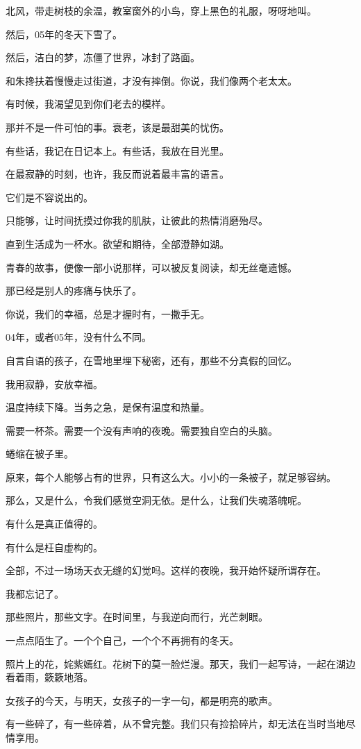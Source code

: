 		北风，带走树枝的余温，教室窗外的小鸟，穿上黑色的礼服，呀呀地叫。

		然后，05年的冬天下雪了。\par
		然后，洁白的梦，冻僵了世界，冰封了路面。

		和朱搀扶着慢慢走过街道，才没有摔倒。你说，我们像两个老太太。\par
		有时候，我渴望见到你们老去的模样。\par
		那并不是一件可怕的事。衰老，该是最甜美的忧伤。

		有些话，我记在日记本上。有些话，我放在目光里。\par
		在最寂静的时刻，也许，我反而说着最丰富的语言。

		它们是不容说出的。

		只能够，让时间抚摸过你我的肌肤，让彼此的热情消磨殆尽。\par
		直到生活成为一杯水。欲望和期待，全部澄静如湖。\par
		青春的故事，便像一部小说那样，可以被反复阅读，却无丝毫遗憾。\par
		那已经是别人的疼痛与快乐了。

		你说，我们的幸福，总是才握时有，一撒手无。\par
		04年，或者05年，没有什么不同。\par
		自言自语的孩子，在雪地里埋下秘密，还有，那些不分真假的回忆。

		我用寂静，安放幸福。

		温度持续下降。当务之急，是保有温度和热量。\par
		需要一杯茶。需要一个没有声响的夜晚。需要独自空白的头脑。

		蜷缩在被子里。

		原来，每个人能够占有的世界，只有这么大。小小的一条被子，就足够容纳。\par
		那么，又是什么，令我们感觉空洞无依。是什么，让我们失魂落魄呢。

		有什么是真正值得的。\par
		有什么是枉自虚构的。

		全部，不过一场场天衣无缝的幻觉吗。这样的夜晚，我开始怀疑所谓存在。

		我都忘记了。

		那些照片，那些文字。在时间里，与我逆向而行，光芒刺眼。\par
		一点点陌生了。一个个自己，一个个不再拥有的冬天。

		照片上的花，姹紫嫣红。花树下的莫一脸烂漫。那天，我们一起写诗，一起在湖边看着雨，簌簌地落。\par
		女孩子的今天，与明天，女孩子的一字一句，都是明亮的歌声。\par
		有一些碎了，有一些碎着，从不曾完整。我们只有捡拾碎片，却无法在当时当地尽情享用。

